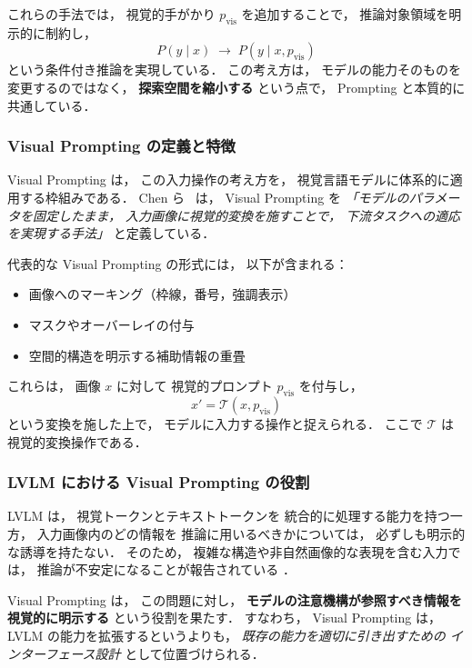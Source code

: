 \documentclass[a4j,12pt,dvipdfmx]{jsreport}
\begin{document}
これらの手法では，
視覚的手がかり $p_{\mathrm{vis}}$ を追加することで，
推論対象領域を明示的に制約し，
\begin{equation}
   P(y \mid x)
   \;\rightarrow\;
   P(y \mid x, p_{\mathrm{vis}})
\end{equation}
という条件付き推論を実現している．
この考え方は，
モデルの能力そのものを変更するのではなく，
\textbf{探索空間を縮小する}
という点で，
Prompting と本質的に共通している．

\subsubsection{Visual Prompting の定義と特徴}

Visual Prompting は，
この入力操作の考え方を，
視覚言語モデルに体系的に適用する枠組みである．
Chen ら~\cite{chen2023visualprompting} は，
Visual Prompting を
\emph{「モデルのパラメータを固定したまま，
   入力画像に視覚的変換を施すことで，
   下流タスクへの適応を実現する手法」}
と定義している．

代表的な Visual Prompting の形式には，
以下が含まれる：
\begin{itemize}
   \item 画像へのマーキング（枠線，番号，強調表示）
   \item マスクやオーバーレイの付与
   \item 空間的構造を明示する補助情報の重畳
\end{itemize}

これらは，
画像 $x$ に対して
視覚的プロンプト $p_{\mathrm{vis}}$ を付与し，
\begin{equation}
   x' = \mathcal{T}(x, p_{\mathrm{vis}})
\end{equation}
という変換を施した上で，
モデルに入力する操作と捉えられる．
ここで $\mathcal{T}$ は視覚的変換操作である．

\subsubsection{LVLM における Visual Prompting の役割}

LVLM は，
視覚トークンとテキストトークンを
統合的に処理する能力を持つ一方，
入力画像内のどの情報を
推論に用いるべきかについては，
必ずしも明示的な誘導を持たない．
そのため，
複雑な構造や非自然画像的な表現を含む入力では，
推論が不安定になることが報告されている
\cite{vivoli_comix_2024-1}．

Visual Prompting は，
この問題に対し，
\textbf{モデルの注意機構が参照すべき情報を
   視覚的に明示する}
という役割を果たす．
すなわち，
Visual Prompting は，
LVLM の能力を拡張するというよりも，
\emph{既存の能力を適切に引き出すための
   インターフェース設計}
として位置づけられる．
\end{document}
